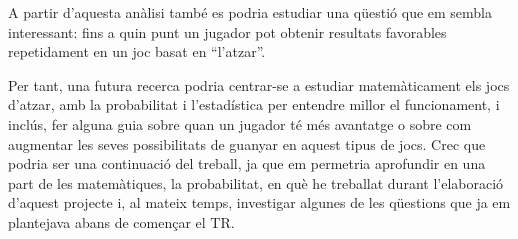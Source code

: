 A partir d’aquesta anàlisi també es podria estudiar una qüestió que em sembla interessant: fins a quin punt un jugador pot obtenir resultats favorables repetidament en un joc basat en ``l’atzar''.

Per tant, una futura recerca podria centrar-se a estudiar matemàticament els jocs d’atzar, amb la probabilitat i l’estadística per entendre millor el funcionament, i inclús, fer alguna guia sobre quan un jugador té més avantatge o sobre com augmentar les seves possibilitats de guanyar en aquest tipus de jocs. Crec que podria ser una continuació del treball, ja que em permetria aprofundir en una part de les matemàtiques, la probabilitat, en què he treballat durant l'elaboració d'aquest projecte i, al mateix temps, investigar algunes de les qüestions que ja em plantejava abans de començar el TR.
